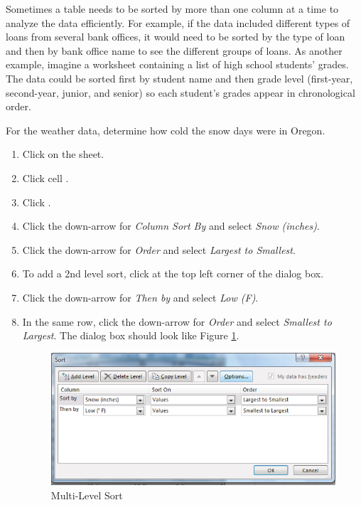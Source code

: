 Sometimes a table needs to be sorted by more than one column at a time to analyze the data efficiently. For example, if the data included different types of loans from several bank offices, it would need to be sorted by the type of loan and then by bank office name to see the different groups of loans. As another example, imagine a worksheet containing a list of high school students’ grades. The data could be sorted first by student name and then grade level (first-year, second-year, junior, and senior) so each student’s grades appear in chronological order.

For the weather data, determine how cold the snow days were in Oregon.

\begin{enumbox}
	\begin{enumerate}
		\item Click on the  sheet.
		\item Click cell .
		\item Click .
		\item Click the down-arrow for \textit{Column Sort By} and select \textit{Snow (inches)}.
		\item Click the down-arrow for \textit{Order} and select \textit{Largest to Smallest}.
		\item To add a 2nd level sort, click  at the top left corner of the dialog box.
		\item Click the down-arrow for \textit{Then by} and select \textit{Low (\textdegree F)}.
		\item In the same row, click the down-arrow for \textit{Order} and select \textit{Smallest to Largest}. The dialog box should look like Figure \ref{05:fig11}.
	
		\begin{figure}[H]
			\centering
			\includegraphics[width=\maxwidth{.95\linewidth}]{gfx/ch05_fig11}
			\caption{Multi-Level Sort}
			\label{05:fig11}
		\end{figure}


\end{enumerate}
\end{enumbox}
